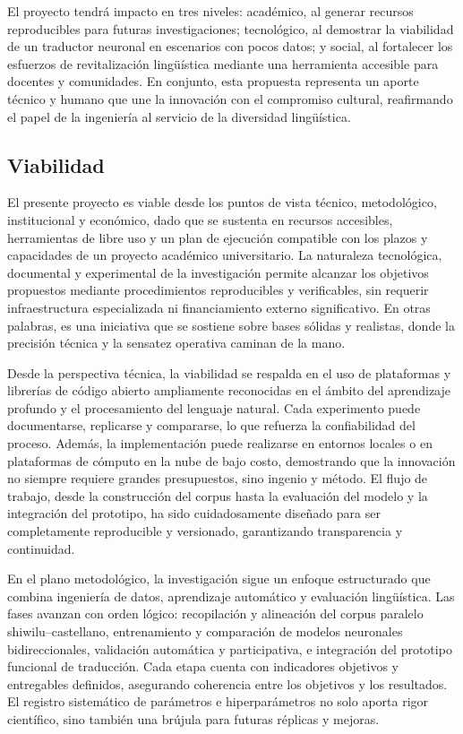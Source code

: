 \documentclass[12pt,a4paper,oneside]{book}
\begin{document}
El proyecto tendrá impacto en tres niveles: académico, al generar recursos reproducibles para futuras investigaciones; tecnológico, al demostrar la viabilidad de un traductor neuronal en escenarios con pocos datos; y social, al fortalecer los esfuerzos de revitalización lingüística mediante una herramienta accesible para docentes y comunidades. En conjunto, esta propuesta representa un aporte técnico y humano que une la innovación con el compromiso cultural, reafirmando el papel de la ingeniería al servicio de la diversidad lingüística.

\subsection*{Viabilidad}

El presente proyecto es viable desde los puntos de vista técnico, metodológico, institucional y económico, dado que se sustenta en recursos accesibles, herramientas de libre uso y un plan de ejecución compatible con los plazos y capacidades de un proyecto académico universitario. La naturaleza tecnológica, documental y experimental de la investigación permite alcanzar los objetivos propuestos mediante procedimientos reproducibles y verificables, sin requerir infraestructura especializada ni financiamiento externo significativo. En otras palabras, es una iniciativa que se sostiene sobre bases sólidas y realistas, donde la precisión técnica y la sensatez operativa caminan de la mano.

Desde la perspectiva técnica, la viabilidad se respalda en el uso de plataformas y librerías de código abierto ampliamente reconocidas en el ámbito del aprendizaje profundo y el procesamiento del lenguaje natural. Cada experimento puede documentarse, replicarse y compararse, lo que refuerza la confiabilidad del proceso. Además, la implementación puede realizarse en entornos locales o en plataformas de cómputo en la nube de bajo costo, demostrando que la innovación no siempre requiere grandes presupuestos, sino ingenio y método. El flujo de trabajo, desde la construcción del corpus hasta la evaluación del modelo y la integración del prototipo, ha sido cuidadosamente diseñado para ser completamente reproducible y versionado, garantizando transparencia y continuidad.

En el plano metodológico, la investigación sigue un enfoque estructurado que combina ingeniería de datos, aprendizaje automático y evaluación lingüística. Las fases avanzan con orden lógico: recopilación y alineación del corpus paralelo shiwilu--castellano, entrenamiento y comparación de modelos neuronales bidireccionales, validación automática y participativa, e integración del prototipo funcional de traducción. Cada etapa cuenta con indicadores objetivos y entregables definidos, asegurando coherencia entre los objetivos y los resultados. El registro sistemático de parámetros e hiperparámetros no solo aporta rigor científico, sino también una brújula para futuras réplicas y mejoras.
\end{document}
